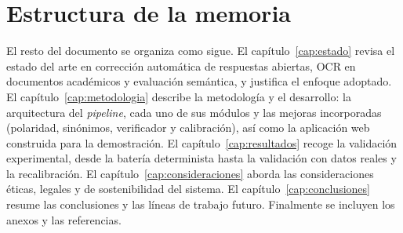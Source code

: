 \section{Estructura de la memoria}

El resto del documento se organiza como sigue. El capítulo~\ref{cap:estado} revisa el estado del arte en corrección automática de respuestas abiertas, OCR en documentos académicos y evaluación semántica, y justifica el enfoque adoptado. El capítulo~\ref{cap:metodologia} describe la metodología y el desarrollo: la arquitectura del \emph{pipeline}, cada uno de sus módulos y las mejoras incorporadas (polaridad, sinónimos, verificador y calibración), así como la aplicación web construida para la demostración. El capítulo~\ref{cap:resultados} recoge la validación experimental, desde la batería determinista hasta la validación con datos reales y la recalibración. El capítulo~\ref{cap:consideraciones} aborda las consideraciones éticas, legales y de sostenibilidad del sistema. El capítulo~\ref{cap:conclusiones} resume las conclusiones y las líneas de trabajo futuro. Finalmente se incluyen los anexos y las referencias.
